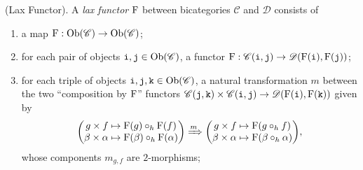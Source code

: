 \noindent\begin{definition} \textup{(Lax Functor).} A {\em lax functor} $\textup{F}$ between bicategories $\mathscr{C}$ and $\mathscr{D}$ consists of
\begin{enumerate}[label=$\bullet$, leftmargin=4\parindent]
\item a map $\textup{F} : \textnormal{Ob}(\mathscr{C}) \to \textnormal{Ob}(\mathscr{C})$;
\item for each pair of objects $\textnormal{\texttt{i}}, \textnormal{\texttt{j}} \in \textnormal{Ob}(\mathscr{C})$, a functor $\textup{F} : \mathscr{C}(\textnormal{\texttt{i}}, \textnormal{\texttt{j}}) \to \mathscr{D}(\textup{F}(\textnormal{\texttt{i}}), \textup{F}(\textnormal{\texttt{j}}))$;
\item for each triple of objects $\textnormal{\texttt{i}}, \textnormal{\texttt{j}}, \textnormal{\texttt{k}} \in \textnormal{Ob}(\mathscr{C})$, a natural transformation $m$ between the two ``composition by $\textup{F}$'' functors $\mathscr{C}(\textnormal{\texttt{j}}, \textnormal{\texttt{k}}) \times \mathscr{C}(\textnormal{\texttt{i}}, \textnormal{\texttt{j}}) \to \mathscr{D}(\textup{F}(\textnormal{\texttt{i}}), \textup{F}(\textnormal{\texttt{k}}))$ given by
\begin{align*}
\begin{split}
\begin{pmatrix}g \times f \mapsto \textup{F}(g) \circ_h \textup{F}(f)\\\beta \times \alpha \mapsto \textup{F}(\beta) \circ_h \textup{F}(\alpha)\end{pmatrix} \xRightarrow{m} \begin{pmatrix}g \times f \mapsto \textup{F}(g \circ_h f)\\\beta \times \alpha \mapsto \textup{F}(\beta \circ_h \alpha)\end{pmatrix}\!, %
\end{split}
\end{align*}
whose components $m_{g, f}$ are $2$-morphisms;

\end{enumerate}
\end{definition}
